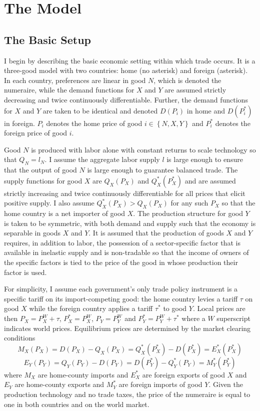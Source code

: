 \documentclass[10pt]{article}
\begin{document}
\section{The Model}
\label{sec:model}

\subsection{The Basic Setup}
\label{sec:basic}
I begin by describing the basic economic setting within which trade occurs. It is a three-good model with two countries: home (no asterisk) and foreign (asterisk). In each country, preferences are linear in good $N$, which is denoted the numeraire, while the demand functions for $X$ and $Y$ are assumed strictly decreasing and twice continuously differentiable. Further, the demand functions for $X$ and $Y$ are taken to be identical and denoted $D(P_i)$ in home and $D(P_i^*)$ in foreign. $P_i$ denotes the home price of good $i \in \left\{N,X,Y\right\}$ and $P_i^*$ denotes the foreign price of good $i$.

Good $N$ is produced with labor alone with constant returns to scale technology so that $Q_N = l_N$. I assume the aggregate labor supply $l$ is large enough to ensure that the output of good $N$ is large enough to guarantee balanced trade. The supply functions for good $X$ are $Q_X(P_X)$ and $Q_X^*(P_X^*)$ and are assumed strictly increasing and twice continuously differentiable for all prices that elicit positive supply. I also assume $Q_X^*(P_X) > Q_X(P_X)$ for any such $P_X$ so that the home country is a net importer of good $X$. The production structure for good $Y$ is taken to be symmetric, with both demand and supply such that the economy is separable in goods $X$ and $Y$. It is assumed that the production of goods $X$ and $Y$ requires, in addition to labor, the possession of a sector-specific factor that is available in inelastic supply and is non-tradable so that the income of owners of the specific factors is tied to the price of the good in whose production their factor is used. 

For simplicity, I assume each government's only trade policy instrument is a specific tariff on its import-competing good: the home country levies a tariff $\tau$ on good $X$ while the foreign country applies a tariff $\tau^*$ to good $Y$. Local prices are then $P_X = P_X^W + \tau$, $P_X^* = P_X^W$, $P_Y = P_Y^W$ and $P_Y^* = P_Y^W + \tau^*$ where a $W$ superscript indicates world prices. Equilibrium prices are determined by the market clearing conditions
$$M_X(P_X)= D(P_X)-Q_X(P_X) = Q_X^*(P_X^*) - D(P_X^*) = E_X^*(P_X^*)$$
$$E_Y(P_Y)=Q_Y(P_Y)-D(P_Y) = D(P_Y^*)-Q_Y^*(P_Y) = M_Y^*(P_Y^*)$$
where $M_X$ are home-county imports and $E_X^*$ are foreign exports of good $X$ and $E_Y$ are home-county exports and $M_Y^*$ are foreign imports of good $Y$. Given the production technology and no trade taxes, the price of the numeraire is equal to one in both countries and on the world market.
\end{document}

